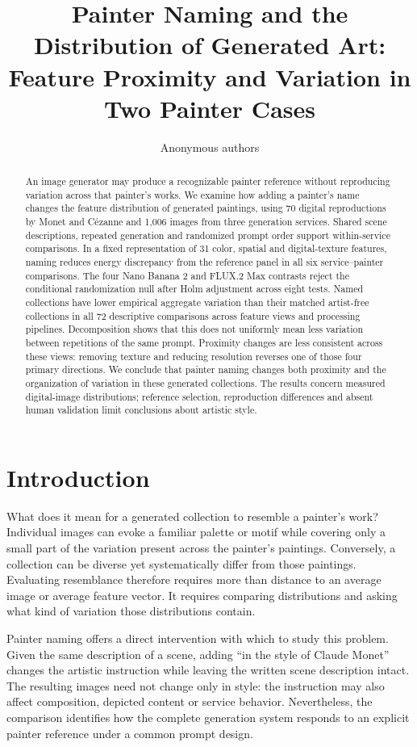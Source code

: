 \documentclass[11pt]{article}
\title{Painter Naming and the Distribution of Generated Art:\\Feature Proximity and Variation in Two Painter Cases}
\author{Anonymous authors}
\date{}
\begin{document}
\maketitle
\begin{abstract}
An image generator may produce a recognizable painter reference without reproducing
variation across that painter's works. We examine how adding a painter's name
changes the feature distribution of generated paintings, using 70 digital
reproductions by Monet and C\'ezanne and 1,006 images from three generation
services. Shared scene descriptions, repeated generation and randomized prompt
order support within-service comparisons. In a fixed representation of 31 color,
spatial and digital-texture features, naming reduces energy discrepancy from the
reference panel in all six service--painter comparisons. The four Nano Banana 2
and FLUX.2 Max contrasts reject the conditional randomization null after Holm
adjustment across eight tests. Named collections have lower empirical aggregate variation than their matched
artist-free collections in all 72 descriptive comparisons across feature views
and processing pipelines. Decomposition shows that this does not uniformly mean less variation
between repetitions of the same prompt. Proximity changes are less consistent across these views: removing
texture and reducing resolution reverses one of those four primary directions. We conclude that painter naming changes both proximity and the
organization of variation in these generated collections. The results concern
measured digital-image distributions; reference selection, reproduction differences
and absent human validation limit conclusions about artistic style.
\end{abstract}

\section{Introduction}
What does it mean for a generated collection to resemble a painter's work?
Individual images can evoke a familiar palette or motif while covering only a
small part of the variation present across the painter's paintings. Conversely,
a collection can be diverse yet systematically differ from those paintings.
Evaluating resemblance therefore requires more than distance to an average image
or average feature vector. It requires comparing distributions and asking what
kind of variation those distributions contain.

Painter naming offers a direct intervention with which to study this problem.
Given the same description of a scene, adding ``in the style of Claude Monet''
changes the artistic instruction while leaving the written scene description
intact. The resulting images need not change only in style: the instruction may
also affect composition, depicted content or service behavior. Nevertheless,
the comparison identifies how the complete generation system responds to an
explicit painter reference under a common prompt design.
\end{document}
